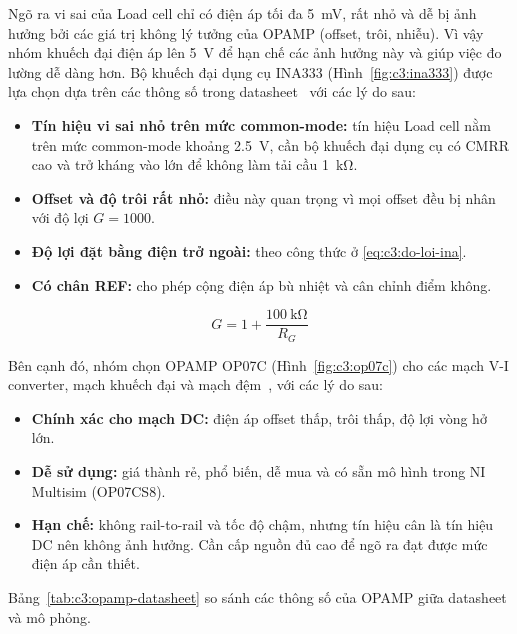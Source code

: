 Ngõ ra vi sai của Load cell chỉ có điện áp tối đa \qty{5}{\milli\volt}, rất nhỏ và dễ bị ảnh hưởng bởi
các giá trị không lý tưởng của OPAMP (offset, trôi, nhiễu). Vì vậy nhóm khuếch đại điện áp lên
\qty{5}{\volt} để hạn chế các ảnh hưởng này và giúp việc đo lường dễ dàng hơn. Bộ khuếch đại dụng cụ
INA333 (Hình~\ref{fig:c3:ina333}) được lựa chọn dựa trên các thông số trong datasheet~\cite{c3_ina333}
với các lý do sau:
\begin{itemize}
    \item \textbf{Tín hiệu vi sai nhỏ trên mức common-mode:} tín hiệu Load cell nằm trên mức common-mode
          khoảng \qty{2.5}{\volt}, cần bộ khuếch đại dụng cụ có CMRR cao và trở kháng vào lớn để không
          làm tải cầu \qty{1}{\kilo\ohm}.
    \item \textbf{Offset và độ trôi rất nhỏ:} điều này quan trọng vì mọi offset đều bị nhân với độ lợi
          $G = 1000$.
    \item \textbf{Độ lợi đặt bằng điện trở ngoài:} theo công thức ở \eqref{eq:c3:do-loi-ina}.
    \item \textbf{Có chân REF:} cho phép cộng điện áp bù nhiệt và cân chỉnh điểm không.
\end{itemize}
\begin{equation}
    G = 1 + \frac{\qty{100}{\kilo\ohm}}{R_G}
    \label{eq:c3:do-loi-ina}
\end{equation}


Bên cạnh đó, nhóm chọn OPAMP OP07C (Hình~\ref{fig:c3:op07c}) cho các mạch V-I converter, mạch khuếch
đại và mạch đệm~\cite{c3_op07c}, với các lý do sau:
\begin{itemize}
    \item \textbf{Chính xác cho mạch DC:} điện áp offset thấp, trôi thấp, độ lợi vòng hở lớn.
    \item \textbf{Dễ sử dụng:} giá thành rẻ, phổ biến, dễ mua và có sẵn mô hình trong NI Multisim (OP07CS8).
    \item \textbf{Hạn chế:} không rail-to-rail và tốc độ chậm, nhưng tín hiệu cân là tín hiệu DC nên không
          ảnh hưởng. Cần cấp nguồn đủ cao để ngõ ra đạt được mức điện áp cần thiết.
\end{itemize}


Bảng~\ref{tab:c3:opamp-datasheet} so sánh các thông số của OPAMP giữa datasheet và mô phỏng.

